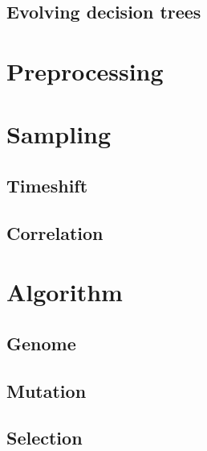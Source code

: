 \documentclass[conference]{IEEEtran}
\begin{document}
\subsection{Evolving decision trees}

\section{Preprocessing}

\section{Sampling}

\subsection{Timeshift}

\subsection{Correlation}


\section{Algorithm}
%

\subsection{Genome}


\subsection{Mutation}

\subsection{Selection}
\end{document}
